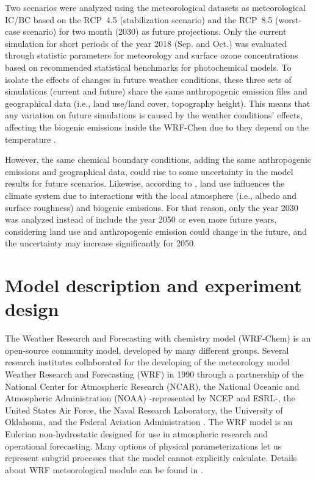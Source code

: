 Two scenarios were analyzed using the meteorological datasets as meteorological IC/BC based on the RCP~4.5 (stabilization scenario) and the RCP~8.5 (worst-case scenario) for two month (2030) as future projections.
Only the current simulation for short periods of the year 2018 (Sep. and Oct.) was evaluated through statistic parameters for meteorology and surface ozone concentrations based on recommended statistical benchmarks for photochemical models.
To isolate the effects of changes in future weather conditions, these three sets of simulations (current and future) share the same anthropogenic emission files and geographical data (i.e., land use/land cover, topography height). This means that any variation on future simulations is caused by the weather conditions' effects, affecting the biogenic emissions inside the WRF-Chen due to they depend on the temperature \citep{Guenther2006}.

However, the same chemical boundary conditions, adding the same anthropogenic emissions and geographical data, could rise to some uncertainty in the model results for future scenarios.
Likewise, according to \citet{VanVuuren2011a}, land use influences the climate system due to interactions with the local atmosphere (i.e., albedo and surface roughness) and biogenic emissions.
For that reason, only the year 2030 was analyzed instead of include the year 2050 or even more future years, considering land use and anthropogenic emission could change in the future, and the uncertainty may increase significantly for 2050.  

\section{Model description and experiment design}
The Weather Research and Forecasting with chemistry model (WRF-Chem) \citep{Grell2005} is an open-source community model, developed by many different groups.
Several research institutes collaborated for the developing of the meteorology model Weather Research and Forecasting (WRF) in 1990 through a partnership of the National Center for Atmospheric Research (NCAR), the National Oceanic and Atmospheric Administration (NOAA) -represented by NCEP and ESRL-, the United States Air Force, the Naval Research Laboratory, the University of Oklahoma, and the Federal Aviation Administration \citep{Skamarock2019}.
The WRF model is an Eulerian non-hydrostatic designed for use in atmospheric research and operational forecasting.
Many options of physical parameterizations let us represent subgrid processes that the model cannot explicitly calculate.
Details about WRF meteorological module can be found in \citet{Skamarock2019}.

